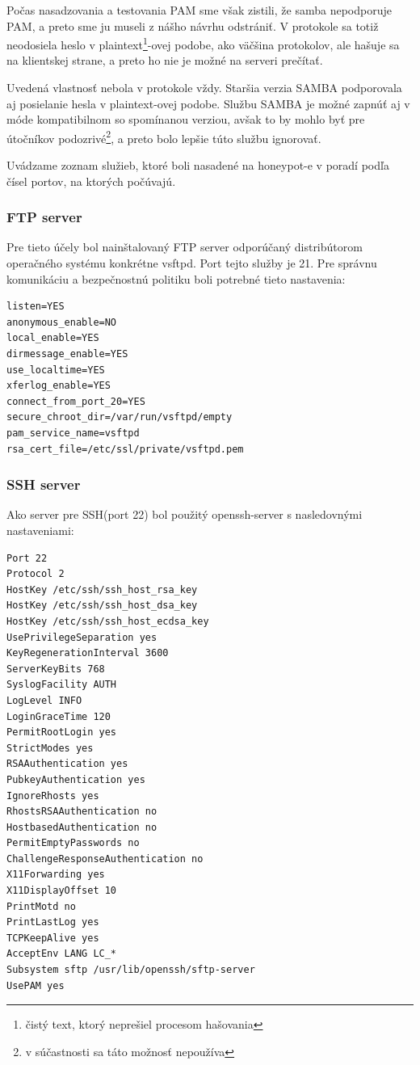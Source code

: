 \documentclass[12pt, oneside]{book}
\begin{document}
Počas nasadzovania a testovania PAM sme však zistili, že samba nepodporuje PAM, a preto sme ju museli z nášho návrhu odstrániť.
V protokole sa totiž neodosiela heslo v plaintext\footnote{čistý text, ktorý neprešiel procesom hašovania}-ovej podobe, ako väčšina protokolov, ale hašuje sa na klientskej strane, a preto ho nie je možné na serveri prečítať.

Uvedená vlastnosť nebola v protokole vždy.
Staršia verzia SAMBA podporovala aj posielanie hesla v plaintext-ovej podobe.
Službu SAMBA je možné zapnúť aj v móde kompatibilnom so spomínanou verziou, avšak to by mohlo byť pre útočníkov podozrivé\footnote{v súčastnosti sa táto možnosť nepoužíva}, a preto bolo lepšie túto službu ignorovať.

Uvádzame zoznam služieb, ktoré boli nasadené na honeypot-e v poradí podľa čísel portov, na ktorých počúvajú.

\subsubsection{FTP server}
Pre tieto účely bol nainštalovaný FTP server odporúčaný distribútorom operačného systému konkrétne vsftpd. Port tejto služby je 21. Pre správnu komunikáciu a bezpečnostnú politiku boli potrebné tieto nastavenia:

\begin{lstlisting}[style=customBash]
listen=YES
anonymous_enable=NO
local_enable=YES
dirmessage_enable=YES
use_localtime=YES
xferlog_enable=YES
connect_from_port_20=YES
secure_chroot_dir=/var/run/vsftpd/empty
pam_service_name=vsftpd
rsa_cert_file=/etc/ssl/private/vsftpd.pem
\end{lstlisting}

\subsubsection{SSH server}
Ako server pre SSH(port 22) bol použitý openssh-server s nasledovnými nastaveniami:

\begin{lstlisting}[style=customBash]
Port 22
Protocol 2
HostKey /etc/ssh/ssh_host_rsa_key
HostKey /etc/ssh/ssh_host_dsa_key
HostKey /etc/ssh/ssh_host_ecdsa_key
UsePrivilegeSeparation yes
KeyRegenerationInterval 3600
ServerKeyBits 768
SyslogFacility AUTH
LogLevel INFO
LoginGraceTime 120
PermitRootLogin yes
StrictModes yes
RSAAuthentication yes
PubkeyAuthentication yes
IgnoreRhosts yes
RhostsRSAAuthentication no
HostbasedAuthentication no
PermitEmptyPasswords no
ChallengeResponseAuthentication no
X11Forwarding yes
X11DisplayOffset 10
PrintMotd no
PrintLastLog yes
TCPKeepAlive yes
AcceptEnv LANG LC_*
Subsystem sftp /usr/lib/openssh/sftp-server
UsePAM yes
\end{lstlisting}
\end{document}
